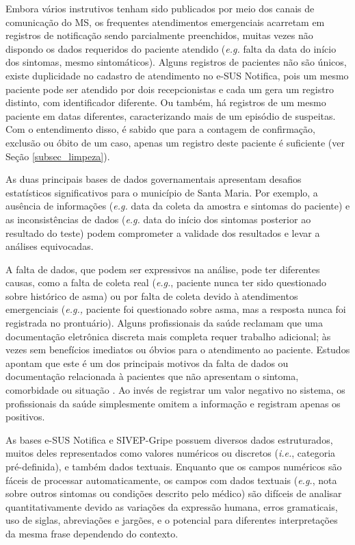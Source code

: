 Embora vários instrutivos tenham sido publicados por meio dos canais de comunicação do MS, os frequentes atendimentos emergenciais acarretam em registros de notificação sendo parcialmente preenchidos, muitas vezes não dispondo os dados requeridos do paciente atendido (\textit{e.g.} falta da data do início dos sintomas, mesmo sintomáticos). Alguns registros de pacientes não são únicos, existe duplicidade no cadastro de atendimento no e-SUS Notifica, pois um mesmo paciente pode ser atendido por dois recepcionistas e cada um gera um registro distinto, com identificador diferente. Ou também, há registros de um mesmo paciente em datas diferentes, caracterizando mais de um episódio de suspeitas. Com o entendimento disso, é sabido que para a contagem de confirmação, exclusão ou óbito de um caso, apenas um registro deste paciente é suficiente (ver Seção \ref{subsec_limpeza}).

As duas principais bases de dados governamentais apresentam desafios estatísticos significativos para o  município de Santa Maria. 
Por exemplo, a ausência de informações (\textit{e.g.} data da coleta da amostra e sintomas do paciente) e as inconsistências de dados (\textit{e.g.} data do início dos sintomas posterior ao resultado do teste) podem comprometer a validade dos resultados e levar a análises equivocadas. 

A falta de dados, que podem ser expressivos na análise, pode ter diferentes causas, como a falta de coleta real (\textit{e.g.}, paciente nunca ter sido questionado sobre histórico de asma) ou por falta de coleta devido à atendimentos emergenciais (\textit{e.g.,} paciente foi questionado sobre asma, mas a resposta nunca foi registrada no prontuário). 
Alguns profissionais da saúde reclamam que uma documentação eletrônica discreta mais completa requer trabalho adicional; às vezes sem benefícios imediatos ou óbvios para o atendimento ao paciente. 
Estudos apontam que este é um dos principais motivos da falta de dados ou documentação relacionada à pacientes que não apresentam o sintoma, comorbidade ou situação \cite{wells2013strategies}. 
Ao invés de registrar um valor negativo no sistema, os profissionais da saúde simplesmente omitem a informação e registram apenas os positivos.
    
As bases e-SUS Notifica e SIVEP-Gripe possuem diversos dados estruturados, muitos deles representados como valores numéricos ou discretos (\textit{i.e.}, categoria pré-definida), e também dados textuais.
Enquanto que os campos numéricos são fáceis de processar automaticamente, os campos com dados textuais (\textit{e.g.}, nota sobre outros sintomas ou condições descrito pelo médico) são difíceis de analisar quantitativamente devido as variações da expressão humana, erros gramaticais, uso de siglas, abreviações e jargões, e o potencial para diferentes interpretações da mesma frase dependendo do contexto.

